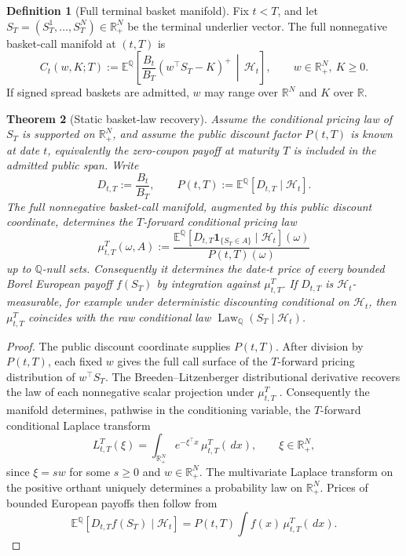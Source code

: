 \documentclass[11pt,a4paper]{amsart}
\theoremstyle{plain}
\newtheorem{theorem}{Theorem}[section]
\theoremstyle{definition}
\newtheorem{definition}[theorem]{Definition}
\theoremstyle{remark}
\DeclareMathOperator{\Law}{Law}
\newcommand{\R}{\mathbb{R}}
\newcommand{\QQ}{\mathbb{Q}}
\newcommand{\EE}{\mathbb{E}}
\newcommand{\cH}{\mathcal{H}}
\newcommand{\dd}{\,d}
\begin{document}
\begin{definition}[Full terminal basket manifold]\label{def:full-terminal-basket-manifold}
Fix \(t<T\), and let \(S_T=(S_T^1,\dots,S_T^N)\in\R_+^N\) be the terminal underlier vector.
The full nonnegative basket-call manifold at \((t,T)\) is
\[
        C_t(w,K;T)
        :=
        \EE^\QQ\!\left[
        \frac{B_t}{B_T}(w^\top S_T-K)^+
        \,\middle|\,\cH_t
        \right],
        \qquad w\in\R_+^N,\ K\ge0.
\]
If signed spread baskets are admitted, \(w\) may range over \(\R^N\) and \(K\) over \(\R\).
\end{definition}

\begin{theorem}[Static basket-law recovery]\label{thm:static-basket-law-recovery}
Assume the conditional pricing law of \(S_T\) is supported on \(\R_+^N\), and assume the public
discount factor \(P(t,T)\) is known at date \(t\), equivalently the zero-coupon payoff at
maturity \(T\) is included in the admitted public span.  Write
\[
        D_{t,T}:=\frac{B_t}{B_T},
        \qquad
        P(t,T):=\EE^\QQ[D_{t,T}\mid\cH_t].
\]
The full nonnegative basket-call manifold, augmented by this public discount coordinate,
determines the \(T\)-forward conditional pricing law
\[
        \mu^T_{t,T}(\omega,A)
        :=
        \frac{
        \EE^\QQ[D_{t,T}\mathbf 1_{\{S_T\in A\}}\mid\cH_t](\omega)
        }{P(t,T)(\omega)}
\]
up to \(\QQ\)-null sets.  Consequently it determines the date-\(t\) price of every bounded
Borel European payoff \(f(S_T)\) by integration against \(\mu^T_{t,T}\).  If \(D_{t,T}\) is
\(\cH_t\)-measurable, for example under deterministic discounting conditional on \(\cH_t\), then
\(\mu^T_{t,T}\) coincides with the raw conditional law
\(\Law_\QQ(S_T\mid\cH_t)\).
\end{theorem}

\begin{proof}
The public discount coordinate supplies \(P(t,T)\).  After division by \(P(t,T)\), each fixed
\(w\) gives the full call surface of the \(T\)-forward pricing distribution of \(w^\top S_T\).
The Breeden--Litzenberger distributional derivative recovers the law of each nonnegative scalar
projection under \(\mu^T_{t,T}\) \cite{breedenLitzenberger1978}.  Consequently the manifold
determines, pathwise in the conditioning variable, the \(T\)-forward conditional Laplace transform
\[
        L^T_{t,T}(\xi)
        =
        \int_{\R_+^N}e^{-\xi^\top x}\,\mu^T_{t,T}(\dd x),
        \qquad \xi\in\R_+^N,
\]
since \(\xi=sw\) for some \(s\ge0\) and \(w\in\R_+^N\).  The multivariate Laplace transform on
the positive orthant uniquely determines a probability law on \(\R_+^N\).  Prices of bounded
European payoffs then follow from
\[
        \EE^\QQ[D_{t,T}f(S_T)\mid\cH_t]
        =
        P(t,T)\int f(x)\,\mu^T_{t,T}(\dd x).
\]
\end{proof}
\end{document}
